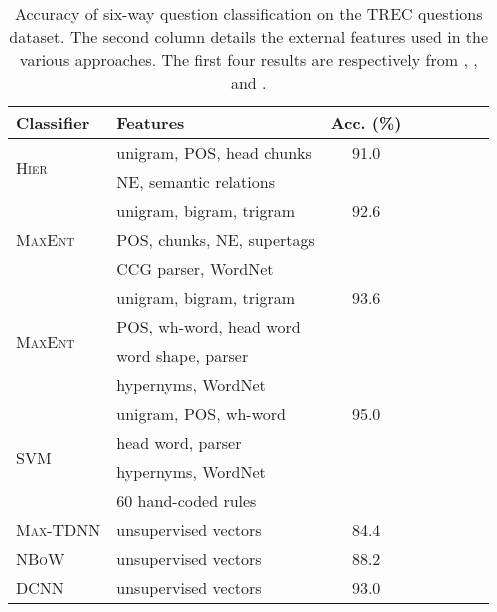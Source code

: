 \documentclass[11pt]{article}
\begin{document}
\begin{table}
\label{sec:qc}
\small
\centering
\begin{tabular}{ l  l c  c  c  c  c c  } 
\toprule
 Classifier & Features & Acc. (\%) \\ \midrule
\multirow{2}{*}{\textsc{Hier}} & unigram, POS, head chunks & 91.0  \\ 
 & NE, semantic relations \\\midrule
\multirow{3}{*}{\textsc{MaxEnt}}  &  unigram, bigram, trigram & 92.6  \\ 
&POS, chunks, NE, supertags & \\
&CCG parser,  WordNet & \\\midrule
\multirow{4}{*}{\textsc{MaxEnt}}  & unigram, bigram, trigram & 93.6  \\ 
& POS, wh-word, head word \\
&  word shape, parser  \\
& hypernyms, WordNet\\\midrule 
\multirow{4}{*}{\textsc{SVM}} & unigram, POS, wh-word & 95.0 \\ 
& head word, parser \\
& hypernyms, WordNet\\
& 60 hand-coded rules \\\midrule 
\textsc{Max-TDNN} & unsupervised vectors & 84.4 \\ \midrule
\textsc{NBoW} & unsupervised  vectors & 88.2 \\ \midrule
\textsc{DCNN} & unsupervised vectors & {93.0} \\ \midrule
\bottomrule
\end{tabular}
\vspace{-0.1cm}
\caption{Accuracy of six-way question classification on the TREC questions dataset. The second column details the external features used in the various approaches. The first four results are respectively from , ,  and . }
\vspace{-0.5cm}
\end{table}
\end{document}

